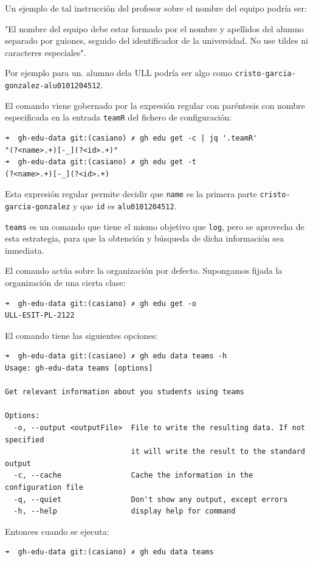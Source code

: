 Un ejemplo de tal instrucción del profesor sobre el nombre del equipo podría ser: 

"El nombre del equipo debe estar formado por el nombre y apellidos del alumno separado por guiones, seguido del identificador de la universidad. No use tildes ni caracteres especiales".

Por ejemplo para un. alumno dela ULL podría ser algo como \verb|cristo-garcia-gonzalez-alu0101204512|. 

El comando viene gobernado por la expresión regular con paréntesis con nombre 
especificada en la entrada \verb|teamR| del fichero de configuración:
\begin{verbatim}
➜  gh-edu-data git:(casiano) ✗ gh edu get -c | jq '.teamR'
"(?<name>.+)[-_](?<id>.+)"
➜  gh-edu-data git:(casiano) ✗ gh edu get -t
(?<name>.+)[-_](?<id>.+)
\end{verbatim}
Esta expresión regular permite decidir que \verb|name| es la primera parte \verb|cristo-garcia-gonzalez| y que \verb|id| es \verb|alu0101204512|.

\verb|teams| es un comando que tiene el mismo objetivo que \verb|log|, pero se aprovecha de esta estrategia, para que la obtención y búsqueda de dicha información sea inmediata.

El comando actúa sobre la organización por defecto. 
Supongamos fijada la organización de una cierta clase:

\begin{verbatim}
➜  gh-edu-data git:(casiano) ✗ gh edu get -o
ULL-ESIT-PL-2122
\end{verbatim}

El comando tiene las siguientes opciones:

\begin{verbatim}
➜  gh-edu-data git:(casiano) ✗ gh edu data teams -h
Usage: gh-edu-data teams [options]

Get relevant information about you students using teams

Options:
  -o, --output <outputFile>  File to write the resulting data. If not specified
                             it will write the result to the standard output
  -c, --cache                Cache the information in the configuration file
  -q, --quiet                Don't show any output, except errors
  -h, --help                 display help for command
\end{verbatim}

Entonces cuando se ejecuta:

\begin{verbatim}
➜  gh-edu-data git:(casiano) ✗ gh edu data teams
\end{verbatim}

